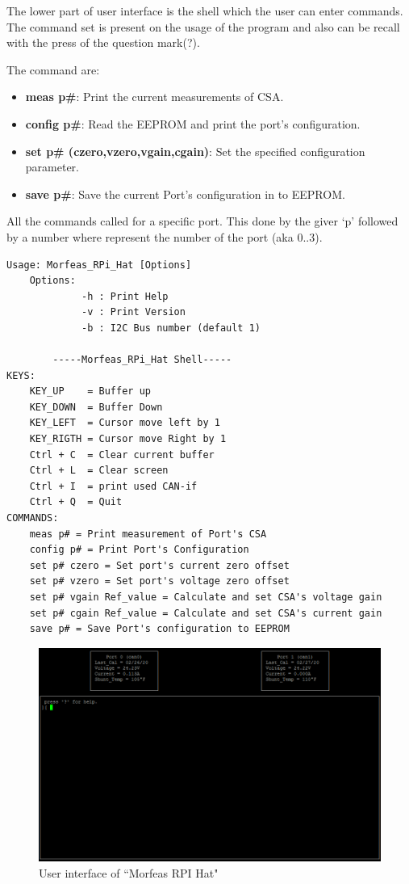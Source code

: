 The lower part of user interface is the shell which the user can enter commands.
The command set is present on the usage of the program and also can be recall with the press of the question mark(?).

The command are:
\begin{itemize}
	\item \textbf{meas p\#}: Print the current measurements of CSA.
	\item \textbf{config p\#}: Read the EEPROM and print the port's configuration.
	\item \textbf{set p\# (czero,vzero,vgain,cgain)}: Set the specified configuration parameter.
	\item \textbf{save p\#}: Save the current Port's configuration in to EEPROM.
\end{itemize}
All the commands called for a specific port. This done by the giver `p' followed by a number where represent the number of the port (aka 0..3).
\newpage
\begin{lstlisting}[frame=single,caption=Usage of ``Morfeas\_RPi\_Hat", label=lst:usage]
Usage: Morfeas_RPi_Hat [Options]
    Options:
             -h : Print Help
             -v : Print Version
             -b : I2C Bus number (default 1)

        -----Morfeas_RPi_Hat Shell-----
KEYS:
    KEY_UP    = Buffer up
    KEY_DOWN  = Buffer Down
    KEY_LEFT  = Cursor move left by 1
    KEY_RIGTH = Cursor move Right by 1
    Ctrl + C  = Clear current buffer
    Ctrl + L  = Clear screen
    Ctrl + I  = print used CAN-if
    Ctrl + Q  = Quit
COMMANDS:
    meas p# = Print measurement of Port's CSA
    config p# = Print Port's Configuration
    set p# czero = Set port's current zero offset
    set p# vzero = Set port's voltage zero offset
    set p# vgain Ref_value = Calculate and set CSA's voltage gain
    set p# cgain Ref_value = Calculate and set CSA's current gain
    save p# = Save Port's configuration to EEPROM
\end{lstlisting}

\begin{figure}[h]
\centering
	\includegraphics[width=5in,angle=0]{./Artwork/UIF.png}
	\caption{User interface of ``Morfeas RPI Hat"}
	\label{fig:Morfeas_RPi_Hat_UIF}
\end{figure}
